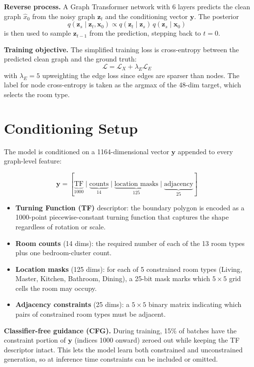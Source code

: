 \documentclass[11pt]{article}
\begin{document}
\textbf{Reverse process.} A Graph Transformer network with 6 layers predicts the clean graph $\hat{x}_0$ from the noisy graph $\mathbf{z}_t$ and the conditioning vector $\mathbf{y}$. The posterior
\[
q(\mathbf{z}_{s} \mid \mathbf{z}_t, \mathbf{x}_0) \propto q(\mathbf{z}_t \mid \mathbf{z}_s)\, q(\mathbf{z}_s \mid \mathbf{x}_0)
\]
is then used to sample $\mathbf{z}_{t-1}$ from the prediction, stepping back to $t=0$.

\textbf{Training objective.} The simplified training loss is cross-entropy between the predicted clean graph and the ground truth:
\[
\mathcal{L} = \mathcal{L}_X + \lambda_E \mathcal{L}_E
\]
with $\lambda_E = 5$ upweighting the edge loss since edges are sparser than nodes. The label for node cross-entropy is taken as the argmax of the 48-dim target, which selects the room type.

\section{Conditioning Setup}

The model is conditioned on a 1164-dimensional vector $\mathbf{y}$ appended to every graph-level feature:

\[
\mathbf{y} = [\underbrace{\text{TF}}_{1000} \mid \underbrace{\text{counts}}_{14} \mid \underbrace{\text{location masks}}_{125} \mid \underbrace{\text{adjacency}}_{25}]
\]

\begin{itemize}
    \item \textbf{Turning Function (TF)} descriptor: the boundary polygon is encoded as a 1000-point piecewise-constant turning function that captures the shape regardless of rotation or scale.
    \item \textbf{Room counts} (14 dims): the required number of each of the 13 room types plus one bedroom-cluster count.
    \item \textbf{Location masks} (125 dims): for each of 5 constrained room types (Living, Master, Kitchen, Bathroom, Dining), a 25-bit mask marks which $5 \times 5$ grid cells the room may occupy.
    \item \textbf{Adjacency constraints} (25 dims): a $5 \times 5$ binary matrix indicating which pairs of constrained room types must be adjacent.
\end{itemize}

\textbf{Classifier-free guidance (CFG).} During training, 15\% of batches have the constraint portion of $\mathbf{y}$ (indices 1000 onward) zeroed out while keeping the TF descriptor intact. This lets the model learn both constrained and unconstrained generation, so at inference time constraints can be included or omitted.
\end{document}
